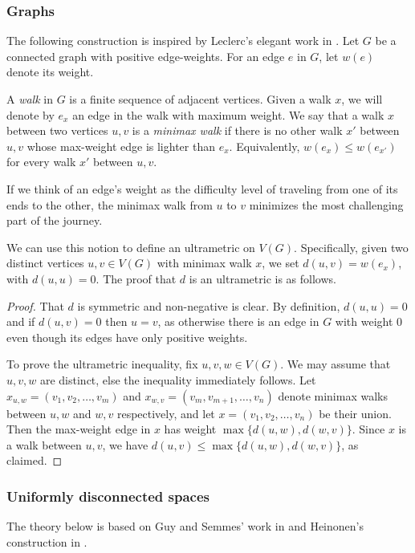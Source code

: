 \subsubsection{Graphs} The following construction is inspired by Leclerc's elegant work in \cite{leclerc:1981}. Let \( G \) be a connected graph with positive edge-weights. For an edge \( e \) in \( G \), let \( w(e) \) denote its weight.

A \emph{walk} in \( G \) is a finite sequence of adjacent vertices. Given a walk \( x \), we will denote by \( e_{x} \) an edge in the walk with maximum weight. We say that a walk \( x \) between two vertices \( u , v \) is a \emph{minimax walk} if there is no other walk \( x' \) between \( u,v \) whose max-weight edge is lighter than \( e_{x}  \). Equivalently, \( w(e_{x}) \leq w(e_{x'}) \) for every walk \( x' \) between \( u,v \).

If we think of an edge's weight as the difficulty level of traveling from one of its ends to the other, the minimax walk from \( u \) to \( v \) minimizes the most challenging part of the journey.

We can use this notion to define an ultrametric on \( V(G) \). Specifically, given two distinct vertices \( u,v \in V(G) \) with minimax walk \( x \), we set \( d(u, v) = w(e_{x}) \), with \( d(u,u) = 0 \). The proof that \( d \) is an ultrametric is as follows.

\begin{proof}
That \( d \) is symmetric and non-negative is clear. By definition, \( d(u, u) = 0 \) and if \( d(u, v) = 0 \) then \( u = v \), as otherwise there is an edge in \( G \) with weight 0 even though its edges have only positive weights.

To prove the ultrametric inequality, fix \( u, v, w \in V(G) \). We may assume that \( u,v,w \) are distinct, else the inequality immediately follows. Let \( x_{u,w} = (v_1, v_2, \hdots , v_{m}) \) and \( x_{w,v} = (v_{m}, v_{m+1} , \hdots , v_{n}) \) denote minimax walks between \( u,w \) and \( w,v \) respectively, and let \( x = (v_1, v_2, \hdots , v_{n}) \) be their union. Then the max-weight edge in \( x \) has weight \( \max \{ d (u, w), d (w,v) \}  \). Since \( x \) is a walk between \( u,v \), we have \( d (u, v) \leq \max \{ d (u,w), d (w,v) \}  \), as claimed.
\end{proof}

\subsubsection{Uniformly disconnected spaces} The theory below is based on Guy and Semmes' work in \cite{fractal:1997} and Heinonen's construction in \cite{metric:2001}.

